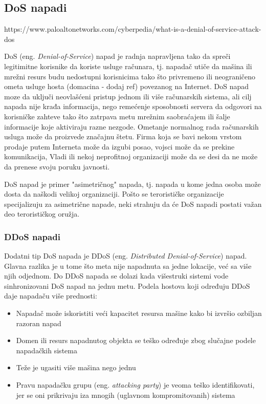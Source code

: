 \documentclass[a4paper]{article}
\theoremstyle{break}
\begin{document}
{\subsection{DoS napadi}
\label{subsec:DoS}

https://www.paloaltonetworks.com/cyberpedia/what-is-a-denial-of-service-attack-dos

DoS (eng. {\em Denial-of-Service}) napad je radnja napravljena tako da spreči legitimitne korisnike da koriste usluge računara, tj. napadač utiče da mašina ili mrežni resurs  budu nedostupni korisnicima tako što privremeno ili neograničeno ometa usluge hosta (domacina - dodaj ref) povezanog na Internet. DoS napad moze da uključi neovlašćeni pristup jednom ili više računarskih sistema, ali cilj napada nije krađa informacija, nego remećenje sposobnosti servera da odgovori na korisničke zahteve tako što zatrpava metu mrežnim saobraćajem ili šalje informacije koje aktiviraju razne nezgode. Ometanje normalnog rada računarskih usluga može da proizvede značajnu štetu. Firma koja se bavi nekom vrstom prodaje putem Interneta može da izgubi posao, vojsci može da se prekine komunikacija, Vladi ili nekoj neprofitnoj organizaciji može da se desi da ne može da prenese svoju poruku javnosti.

DoS napad je primer "asimetričnog" napada, tj. napada u kome jedna osoba može dosta da naškodi velikoj organizaciji. Pošto se terorističke organizacije specijalizuju za asimetrične napade, neki strahuju da će DoS napadi postati važan deo terorističkog oružja.

\subsubsection{DDoS napadi}
\label{subsubsec:DDoS}

Dodatni tip DoS napada je DDoS (eng. {\em Distributed Denial-of-Service}) napad. Glavna razlika je u tome što meta nije napadnuta sa jedne lokacije, već sa više njih odjednom. Do DDoS napada se dolazi kada višestruki sistemi vode sinhronizovani DoS napad na jednu metu. Podela hostova koji određuju DDoS daje napadaču više prednosti:
\begin{itemize}
\item Napadač može iskoristiti veći kapacitet resursa mašine kako bi izvršio ozbiljan razoran napad
\item Domen ili resurs napadnutog objekta se teško određuje zbog slučajne podele napadačkih sistema
\item Teže je ugasiti više mašina nego jednu
\item Pravu napadačku grupu (eng. {\em attacking party}) je veoma teško identifikovati, jer se oni prikrivaju iza mnogih (uglavnom kompromitovanih) sistema
\end{itemize}

}
\end{document}
